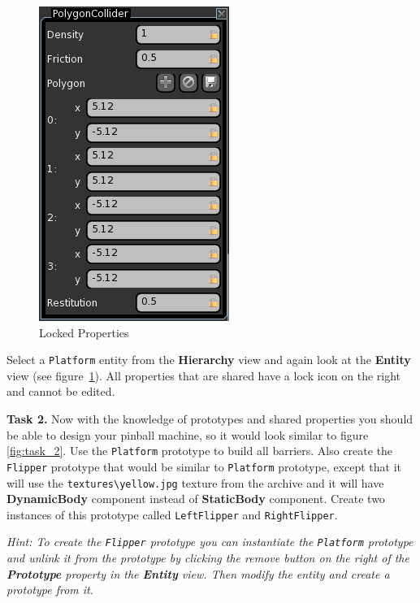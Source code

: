 \documentclass[a4paper,12pt]{article}
\begin{document}
\begin{figure}
\vspace{-20pt}
\capstart
\begin{center}
  \includegraphics[scale=0.65]{LockedProperties}
 \end{center}
 \vspace{-20pt}
 \caption{Locked Properties}
 \label{fig:locked_properties}
 \vspace{-10pt}
\end{figure}

Select a \texttt{Platform} entity from the \textbf{Hierarchy} view and again look at the \textbf{Entity} view (see figure~\ref{fig:locked_properties}). All properties that are shared have a lock icon on the right and cannot be edited.

\textbf{Task 2.} Now with the knowledge of prototypes and shared properties you should be able to design your pinball machine, so it would look similar to figure \ref{fig:task_2}. Use the \texttt{Platform} prototype to build all barriers. Also create the \texttt{Flipper} prototype that would be similar to \texttt{Platform} prototype, except that it will use the \texttt{textures\textbackslash yellow.jpg} texture from the archive and it will have \textbf{DynamicBody} component instead of \textbf{StaticBody} component. Create two instances of this prototype called \texttt{LeftFlipper} and \texttt{RightFlipper}.

\textit{Hint: To create the \texttt{Flipper} prototype you can instantiate the \texttt{Platform} prototype and unlink it from the prototype by clicking the remove button on the right of the \textbf{Prototype} property in the \textbf{Entity} view. Then modify the entity and create a prototype from it.}
\end{document}
